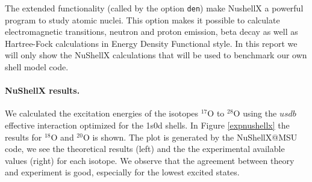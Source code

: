 \documentclass[twoside]{article}
\begin{document}
The extended functionality (called by the option \texttt{den}) make NushellX a powerful program to study atomic nuclei. This option makes it possible to calculate electromagnetic transitions, neutron and proton emission, beta decay as well as Hartree-Fock calculations in Energy Density Functional style. In this report we will only show the NuShellX calculations that will be used to benchmark our own shell model code. 

\paragraph{NuShellX results.} We calculated the excitation energies of the isotopes $^{17}$O to $^{28}$O using the $usdb$ effective interaction optimized for the 1s0d shells. In Figure \ref{expnushellx} the results for $^{18}$O and $^{20}$O is shown. The plot is generated by the NuShellX@MSU code, we see the theoretical results (left) and the the experimental available values (right) for each isotope. We observe that the agreement between theory and experiment is good, especially for the lowest excited states. 
\end{document}

